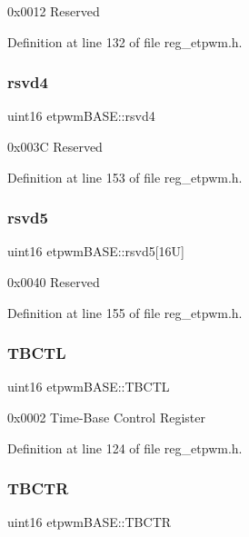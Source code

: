 0x0012 Reserved 

Definition at line 132 of file reg\+\_\+etpwm.\+h.

\mbox{\label{structetpwmBASE_aebaf6290dffdf63bf0302f1256a0b5d1}} 
\subsubsection{\texorpdfstring{rsvd4}{rsvd4}}
{\footnotesize\ttfamily uint16 etpwm\+B\+A\+S\+E\+::rsvd4}

0x003C Reserved 

Definition at line 153 of file reg\+\_\+etpwm.\+h.

\mbox{\label{structetpwmBASE_a8032c3b167adb8d0afa838bb85c9524f}} 
\subsubsection{\texorpdfstring{rsvd5}{rsvd5}}
{\footnotesize\ttfamily uint16 etpwm\+B\+A\+S\+E\+::rsvd5\mbox{[}16\+U\mbox{]}}

0x0040 Reserved 

Definition at line 155 of file reg\+\_\+etpwm.\+h.

\mbox{\label{structetpwmBASE_a31d552a441cd8839de6c5977d3a3089c}} 
\subsubsection{\texorpdfstring{T\+B\+C\+TL}{TBCTL}}
{\footnotesize\ttfamily uint16 etpwm\+B\+A\+S\+E\+::\+T\+B\+C\+TL}

0x0002 Time-\/\+Base Control Register 

Definition at line 124 of file reg\+\_\+etpwm.\+h.

\mbox{\label{structetpwmBASE_a5d83fc39484fd285efcac355ff50a4d2}} 
\subsubsection{\texorpdfstring{T\+B\+C\+TR}{TBCTR}}
{\footnotesize\ttfamily uint16 etpwm\+B\+A\+S\+E\+::\+T\+B\+C\+TR}

